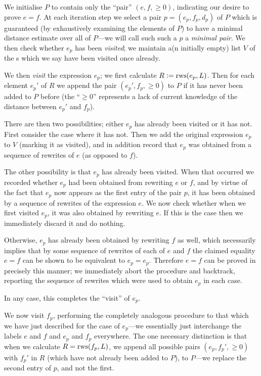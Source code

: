 \documentclass[12pt]{easychair}
\begin{document}
We initialise $P$ to contain only the ``pair'' $(e, f, \geq 0)$, indicating our desire to prove $e = f$. At each iteration step we select a pair $p = (e_p, f_p, d_p)$ of $P$ which is guaranteed (by exhaustively examining the elements of $P$) to have a minimal distance estimate over all of $P$---we will call such such a $p$ a \textit{minimal pair}. We then check whether $e_p$ has been \textit{visited}; we maintain a(n initially empty) list $V$ of the \expr{}s which we say have been visited once already.

We then \textit{visit} the expression $e_p$; we first calculate $R := \operatorname{rws}(e_p, L)$. Then for each element $e_p'$ of $R$ we append the pair $(e_p', f_p, \geq 0)$ to $P$ if it has never been added to $P$ before (the ``$\geq 0$'' represents a lack of current knowledge of the distance between $e_p'$ and $f_p$).

There are then two possibilities; either $e_p$ has already been visited or it has not. First consider the case where it has not. Then we add the original expression $e_p$ to $V$ (marking it as visited), and in addition record that $e_p$ was obtained from a sequence of rewrites of $e$ (as opposed to $f$).

The other possibility is that $e_p$ has already been visited. When that occurred we recorded whether $e_p$ had been obtained from rewriting $e$ or $f$, and by virtue of the fact that $e_p$ now appears as the first entry of the pair $p$, it has been obtained by a sequence of rewrites of the expression $e$. We now check whether when we first visited $e_p$, it was also obtained by rewriting $e$. If this is the case then we immediately discard it and do nothing.

Otherwise, $e_p$ has already been obtained by rewriting $f$ as well, which necessarily implies that by some sequence of rewrites of each of $e$ and $f$ the claimed equality $e = f$ can be shown to be equivalent to $e_p = e_p$. Therefore $e = f$ can be proved in precisely this manner; we immediately abort the procedure and backtrack, reporting the sequence of rewrites which were used to obtain $e_p$ in each case.

In any case, this completes the ``visit'' of $e_p$.

We now visit $f_p$, performing the completely analogous procedure to that which we have just described for the case of $e_p$---we essentially just interchange the labels $e$ and $f$ and $e_p$ and $f_p$ everywhere. The one necessary distinction is that when we calculate $R = \operatorname{rws}(f_p, L)$, we append all possible pairs $(e_p, f_p', \geq 0)$ with $f_p'$ in $R$ (which have not already been added to $P$), to $P$---we replace the second entry of $p$, and not the first.
\end{document}
